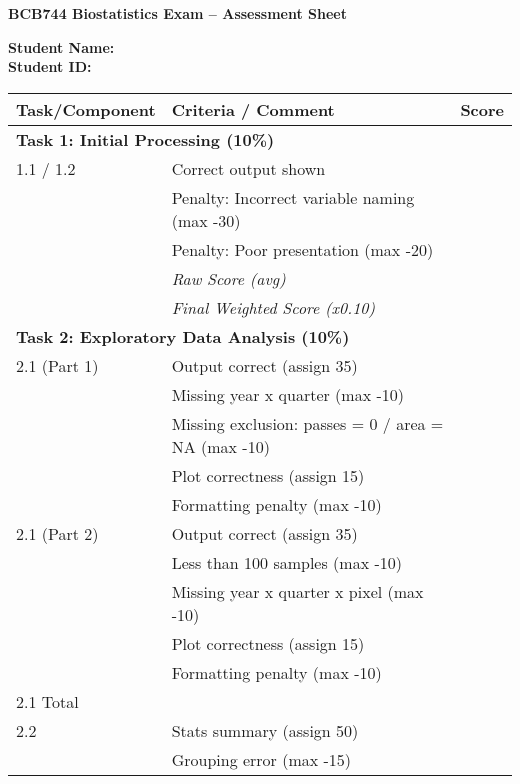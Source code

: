 \documentclass[11pt,a4paper]{article}
\begin{document}
\begin{center}
\LARGE\textbf{BCB744 Biostatistics Exam – Assessment Sheet}
\end{center}

\vspace{1em}

\noindent
\textbf{Student Name:} \hrulefill \\
\textbf{Student ID:} \hrulefill \\

\vspace{1em}

\begin{longtable}{p{}p{}p{}}
\toprule
\textbf{Task/Component} & \textbf{Criteria / Comment} & \textbf{Score} \\
\midrule
\multicolumn{3}{l}{\textbf{Task 1: Initial Processing (10\%)}} \\
1.1 / 1.2 & Correct output shown &  \\
         & Penalty: Incorrect variable naming (max -30) &  \\
         & Penalty: Poor presentation (max -20) &  \\
         & \textit{Raw Score (avg)} & \\
         & \textit{Final Weighted Score (x0.10)} & \\
\midrule
\multicolumn{3}{l}{\textbf{Task 2: Exploratory Data Analysis (10\%)}} \\
2.1 (Part 1) & Output correct (assign 35) &  \\
            & Missing year x quarter (max -10) &  \\
            & Missing exclusion: passes = 0 / area = NA (max -10) &  \\
            & Plot correctness (assign 15) &  \\
            & Formatting penalty (max -10) &  \\
2.1 (Part 2) & Output correct (assign 35) &  \\
            & Less than 100 samples (max -10) &  \\
            & Missing year x quarter x pixel (max -10) &  \\
            & Plot correctness (assign 15) &  \\
            & Formatting penalty (max -10) &  \\
2.1 Total    & & \\
2.2 & Stats summary (assign 50) &  \\
    & Grouping error (max -15) &  \\

\end{longtable}
\end{document}
